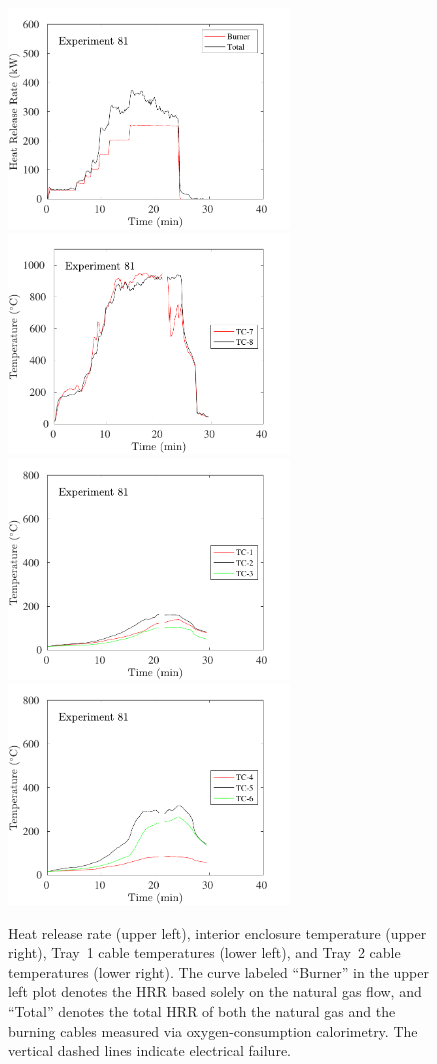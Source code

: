 \begin{figure}[H]
\includegraphics[height=2.30in]{../SCRIPT_FIGURES/Test_81_HRR} \hfill
\includegraphics[height=2.30in]{../SCRIPT_FIGURES/Test_81_TC_7-8} \\
\includegraphics[height=2.30in]{../SCRIPT_FIGURES/Test_81_TC_1-3} \hfill
\includegraphics[height=2.30in]{../SCRIPT_FIGURES/Test_81_TC_4-6}
\caption[HRR and temperatures of Experiment 81]{Heat release rate (upper left), interior enclosure temperature (upper right), Tray~1 cable temperatures (lower left), and Tray~2 cable temperatures (lower right). The curve labeled ``Burner'' in the upper left plot denotes the HRR based solely on the natural gas flow, and ``Total'' denotes the total HRR of both the natural gas and the burning cables measured via oxygen-consumption calorimetry. The vertical dashed lines indicate electrical failure.}
\label{fig:Test_81}
\end{figure}

